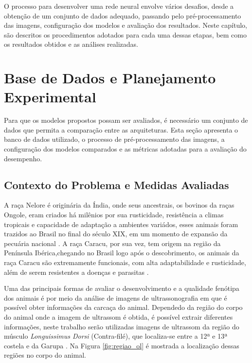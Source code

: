 O processo para desenvolver uma rede neural envolve vários desafios, desde a obtenção de um conjunto de dados adequado, passando pelo pré-processamento das imagens, configuração dos modelos e avaliação dos resultados. Neste capítulo, são descritos os procedimentos adotados para cada uma dessas etapas, bem como os resultados obtidos e as análises realizadas.
\section{Base de Dados e Planejamento Experimental}
Para que os modelos propostos possam ser avaliados, é necessário um conjunto de dados que permita a comparação entre as arquiteturas. Esta seção apresenta o banco de dados utilizado, o processo de pré-processamento das imagens, a configuração dos modelos comparados e as métricas adotadas para a avaliação do desempenho.
\subsection{Contexto do Problema e Medidas Avaliadas}

A raça Nelore é originária da Índia, onde seus ancestrais, os bovinos da raças Ongole, eram criados há milênios por sua rusticidade, resistência a climas tropicais e capacidade de adaptação a ambientes variádos, esses animais foram trazidos ao Brasil no final do século XIX, em um momento de expansão da pecuária nacional \cite{hist_nelore}. A raça Caracu, por sua vez, tem origem na região da Península Ibérica,chegando no Brasil  logo após o descobrimento, os animais da raça Caracu são extremamente funcionais, com alta adaptabilidade e rusticidade, além de serem resistentes a doenças e parasitas \cite{hist_caracu}. 



Uma das principais formas de avaliar o desenvolvimento e a qualidade fenótipa dos animais é por meio da análise de imagens de ultrassonografia em que é possível obter informações da carcaça do animal. Dependedo da região do corpo do animal onde a imagem de ultrassom é obtida, é possível extrair diferentes informações, neste trabalho serão utilizadas imagens de ultrassom da região do músculo \textit{Longuissimus Dorsi} (Contra-filé), que localiza-se entre a 12ª e 13ª costela e da Garupa \cite{cap3:carcaça}. Na Figura \ref{fig:regiao_ol} é mostrada a localização dessas regiões no corpo do animal.

